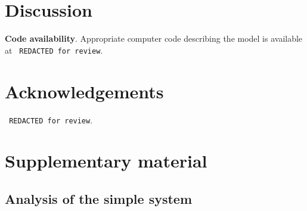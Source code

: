 \documentclass{article}
\begin{document}
\section{Discussion}


\textbf{Code availability}.
Appropriate computer code describing the model is available at 
\texttt{ REDACTED for review}.%

\section{Acknowledgements}
\texttt{ REDACTED for review}.%





\renewcommand{\theequation}{SI.\arabic{equation}}
\setcounter{equation}{0}

\renewcommand{\thefigure}{SI.\arabic{figure}}
\setcounter{figure}{0}

\section{Supplementary material}


\subsection{Analysis of the simple system}
\end{document}
